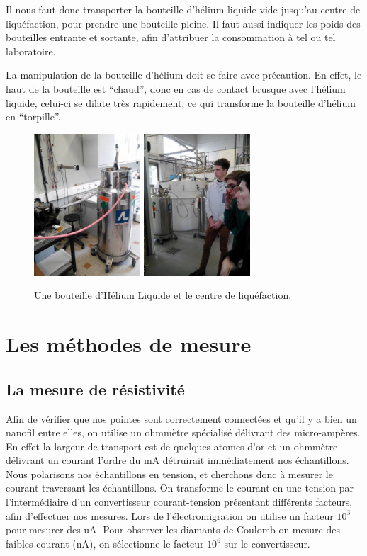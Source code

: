Il nous faut donc transporter la bouteille d'hélium liquide vide jusqu'au centre de liquéfaction, pour prendre une bouteille pleine. Il faut aussi indiquer les poids des bouteilles entrante et sortante, afin d'attribuer la consommation à tel ou tel laboratoire.

La manipulation de la bouteille d'hélium doit se faire avec précaution. En effet, le haut de la bouteille est “chaud”, donc en cas de contact brusque avec l'hélium liquide, celui-ci se dilate très rapidement, ce qui transforme la bouteille d'hélium en “torpille”.
\begin{figure}[h]
    \begin{center}
        \includegraphics[width=150px]{Photos/Bouteille_Helium_Liquide.jpg}
        \includegraphics[width=150px]{Photos/Centre_Helium_Liquide.jpg}
        \caption{Une bouteille d'Hélium Liquide et le centre de liquéfaction.}
        \label{fig:}
    \end{center}
\end{figure}

\section{Les méthodes de mesure}
\subsection{La mesure de résistivité}
Afin de vérifier que nos pointes sont correctement connectées et qu'il y a bien un nanofil entre elles, on utilise un ohmmètre spécialisé délivrant des micro-ampères. En effet la largeur de transport est de quelques atomes d'or et un ohmmètre délivrant un courant l'ordre du mA détruirait immédiatement nos échantillons.
Nous polarisons nos échantillons en tension, et cherchons donc à mesurer le courant traversant les échantillons.
On transforme le courant en une tension par l'intermédiaire d'un convertisseur courant-tension présentant différents facteurs, afin d'effectuer nos mesures. Lors de l'électromigration on utilise un facteur $10^3$ pour mesurer des uA.
Pour observer les diamants de Coulomb on mesure des faibles courant (nA), on sélectionne le facteur $10^6$ sur le convertisseur. 

